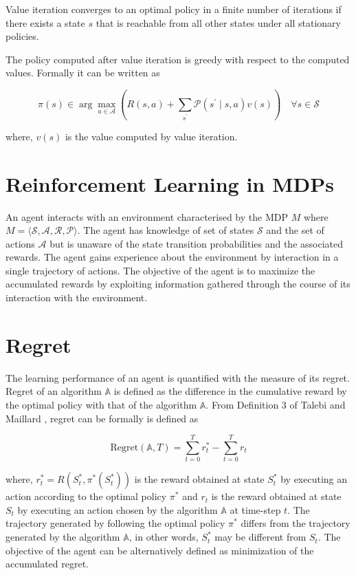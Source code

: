 Value iteration converges to an optimal policy in a finite number of iterations \cite{puterman_chapter_1990} if there exists a state $s$ that is reachable from all other states under all stationary policies.

The policy computed after value iteration is greedy with respect to the computed values.
Formally it can be written as

\begin{equation}
    \pi(s) \in \arg\max_{a \in \mathcal{A}} \left( R(s, a) + \sum_{s^\prime}{\mathcal{P}(s^\prime \mid s, a)} v(s) \right) \quad \forall s \in \mathcal{S}
\end{equation}

where, $v(s)$ is the value computed by value iteration.

\section{Reinforcement Learning in MDPs}

An agent interacts with an environment characterised by the MDP $M$ where $M = \langle \mathcal{S}, \mathcal{A}, \mathcal{R}, \mathcal{P} \rangle$.
The agent has knowledge of set of states $\mathcal{S}$ and the set of actions $\mathcal{A}$ but is unaware of the state transition probabilities and the associated rewards.
The agent gains experience about the environment by interaction in a single trajectory of actions.
The objective of the agent is to maximize the accumulated rewards by exploiting information gathered through the course of its interaction with the environment.

\section{Regret}

The learning performance of an agent is quantified with the measure of its regret.
Regret of an algorithm $\mathbb{A}$ is defined as the difference in the cumulative reward by the optimal policy with that of the algorithm $\mathbb{A}$.
From Definition 3 of Talebi and Maillard \cite{talebi_variance-aware_2018}, regret can be formally is defined as

\begin{equation}
    \label{eqn:regret}
    \text{Regret}(\mathbb{A}, T) = \sum_{t = 0}^T r^*_t - \sum_{t = 0}^T r_t 
\end{equation}

where, $r^*_t = R(S^*_t, \pi^*(S^*_t))$ is the reward obtained at state $S^*_t$ by executing an action according to the optimal policy $\pi^*$ and $r_t$ is the reward obtained at state $S_t$ by executing an action chosen by the algorithm $\mathbb{A}$ at time-step $t$.
The trajectory generated by following the optimal policy $\pi^*$ differs from the trajectory generated by the algorithm $\mathbb{A}$, in other words, $S^*_t$ may be different from $S_t$.
The objective of the agent can be alternatively defined as minimization of the accumulated regret.

